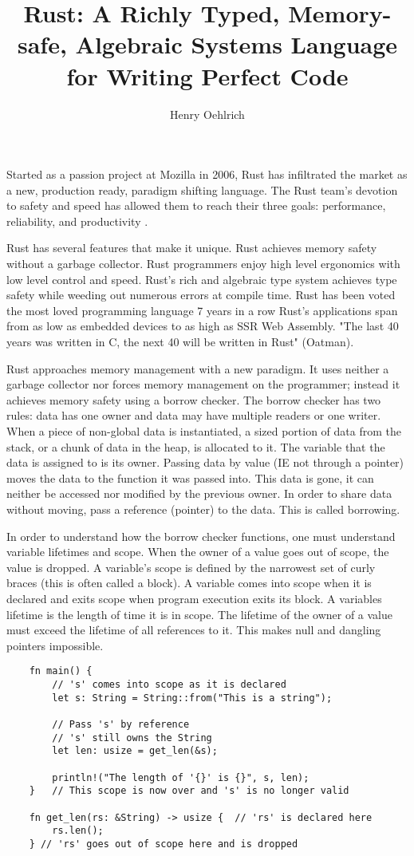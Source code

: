\documentclass[12pt]{article}
\author{Henry Oehlrich}
\title{Rust: A Richly Typed, Memory-safe, Algebraic Systems Language for Writing Perfect Code}
\begin{document}
\makeheader{}
\setlength{\parindent}{20pt}
Started as a passion project at Mozilla in 2006, Rust has infiltrated the
market as a new, production ready, paradigm shifting language. The Rust team's
devotion to safety and speed has allowed them to reach their three goals:
performance, reliability, and productivity \cite{rust-lang.org}.

Rust has several features that make it unique. Rust achieves memory safety
without a garbage collector. Rust programmers enjoy high level ergonomics with
low level control and speed. Rust's rich and algebraic type system achieves
type safety while weeding out numerous errors at compile time. Rust has been
voted the most loved programming language 7 years in a row \cite{so-dev-surve}
Rust's applications span from as low as embedded devices to as high as SSR Web
Assembly. "The last 40 years was written in C, the next 40 will be written in
Rust" (Oatman).


Rust approaches memory management with a new paradigm. It uses neither a
garbage collector nor forces memory management on the programmer; instead it
achieves memory safety using a borrow checker. The borrow checker has two
rules: data has one owner and data may have multiple readers or one writer.
When a piece of non-global data is instantiated, a sized portion of data from
the stack, or a chunk of data in the heap, is allocated to it. The variable
that the data is assigned to is its owner. Passing data by value (IE not
through a pointer) moves the data to the function it was passed into. This data
is gone, it can neither be accessed nor modified by the previous owner. In
order to share data without moving, pass a reference (pointer) to the data.
This is called borrowing. 

In order to understand how the borrow checker functions, one must understand
variable lifetimes and scope. When the owner of a value goes out of scope, the
value is dropped. A variable's scope is defined by the narrowest set of curly
braces (this is often called a block). A variable comes into scope when it is
declared and exits scope when program execution exits its block. A variables
lifetime is the length of time it is in scope. The lifetime of the owner of a
value must exceed the lifetime of all references to it. This makes null and
dangling pointers impossible.

\singlespacing{}
\begin{verbatim}
    fn main() {
        // 's' comes into scope as it is declared
        let s: String = String::from("This is a string");

        // Pass 's' by reference
        // 's' still owns the String
        let len: usize = get_len(&s);

        println!("The length of '{}' is {}", s, len);
    }   // This scope is now over and 's' is no longer valid

    fn get_len(rs: &String) -> usize {  // 'rs' is declared here
        rs.len();
    } // 'rs' goes out of scope here and is dropped
\end{verbatim}
\doublespacing{}
\end{document}
